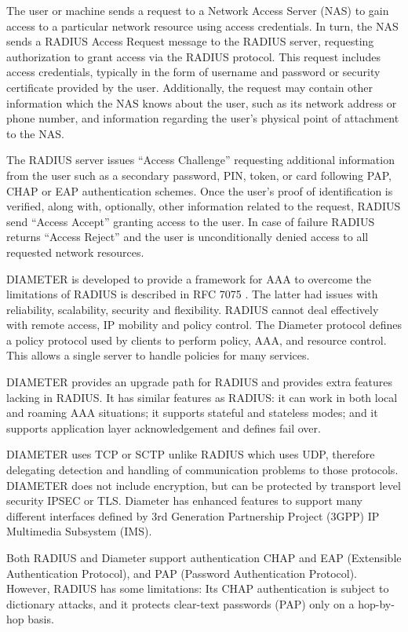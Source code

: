 \begin{multicols}{2}
The user or machine sends a request to a Network Access Server (NAS) to gain access to a particular network resource using access credentials. In turn, the NAS sends a RADIUS Access Request message to the RADIUS server, requesting authorization to grant access via the RADIUS protocol. This request includes access credentials, typically in the form of username and password or security certificate provided by the user. Additionally, the request may contain other information which the NAS knows about the user, such as its network address or phone number, and information regarding the user's physical point of attachment to the NAS. 

The RADIUS server issues ``Access Challenge'' requesting additional information from the user such as a secondary password, PIN, token, or card following PAP, CHAP or EAP \cite{chap2-key9} authentication schemes. Once the user's proof of identification is verified, along with, optionally, other information related to the request, RADIUS send ``Access Accept'' granting access to the user. In case of failure RADIUS returns ``Access Reject'' and the user is unconditionally denied access to all requested network resources.

DIAMETER is developed to provide a framework for AAA to overcome the limitations of RADIUS is described in RFC 7075 \cite{chap2-key24}. The latter had issues with reliability, scalability, security and flexibility. RADIUS cannot deal effectively with remote access, IP mobility and policy control. The Diameter protocol defines a policy protocol used by clients to perform policy, AAA, and resource control. This allows a single server to handle policies for many services.

DIAMETER provides an upgrade path for RADIUS and provides extra features lacking in RADIUS. It has similar features as RADIUS: it can work in both local and roaming AAA situations; it supports stateful and stateless modes; and it supports application layer acknowledgement and defines fail over.

DIAMETER uses TCP or SCTP unlike RADIUS which uses UDP, therefore delegating detection and handling of communication problems to those protocols. DIAMETER does not include encryption, but can be protected by transport level security IPSEC or TLS. Diameter has enhanced features to support many different interfaces defined by 3rd Generation Partnership Project (3GPP) IP Multimedia Subsystem (IMS).

\medskip

Both RADIUS and Diameter support authentication CHAP and EAP (Extensible Authentication Protocol), and PAP (Password Authentication Protocol). However, RADIUS has some limitations: Its CHAP authentication is subject to dictionary attacks, and it protects clear-text passwords (PAP) only on a hop-by-hop basis. 


\end{multicols}
